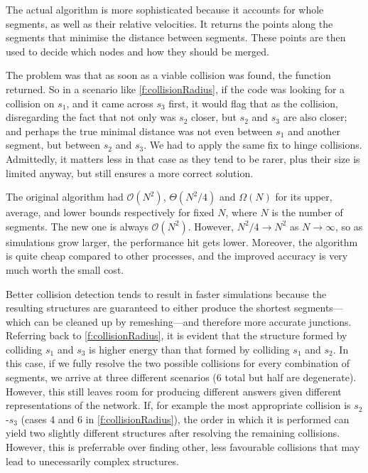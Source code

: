 The actual algorithm is more sophisticated because it accounts for whole segments, as well as their relative velocities. It returns the points along the segments that minimise the distance between segments. These points are then used to decide which nodes and how they should be merged.

The problem was that as soon as a viable collision was found, the function returned. So in a scenario like \cref{f:collisionRadius}, if the code was looking for a collision on $s_1$, and it came across $s_3$ first, it would flag that as the collision, disregarding the fact that not only was $s_2$ closer, but $s_2$ and $s_3$ are also closer; and perhaps the true minimal distance was not even between $s_1$ and another segment, but between $s_2$ and $s_3$. We had to apply the same fix to hinge collisions. Admittedly, it matters less in that case as they tend to be rarer, plus their size is limited anyway, but still ensures a more correct solution.

The original algorithm had $\mathcal{O}(N^2)$, $\Theta(N^2/4)$ and $\Omega(N)$ for its upper, average, and lower bounds respectively for fixed $N$, where $N$ is the number of segments. The new one is always $\mathcal{O}(N^2)$. However, $N^2/4 \to N^2$ as $N\to\infty$, so as simulations grow larger, the performance hit gets lower. Moreover, the algorithm is quite cheap compared to other processes, and the improved accuracy is very much worth the small cost.

Better collision detection tends to result in faster simulations because the resulting structures are guaranteed to either produce the shortest segments---which can be cleaned up by remeshing---and therefore more accurate junctions. Referring back to \cref{f:collisionRadius}, it is evident that the structure formed by colliding $s_1$ and $s_3$ is higher energy than that formed by colliding $s_1$ and $s_2$. In this case, if we fully resolve the two possible collisions for every combination of segments, we arrive at three different scenarios (6 total but half are degenerate). However, this still leaves room for producing different answers given different representations of the network. If, for example the most appropriate collision is $s_2$-$s_3$ (cases 4 and 6 in \cref{f:collisionRadius}), the order in which it is performed can yield two slightly different structures after resolving the remaining collisions. However, this is preferrable over finding other, less favourable collisions that may lead to unecessarily complex structures.

